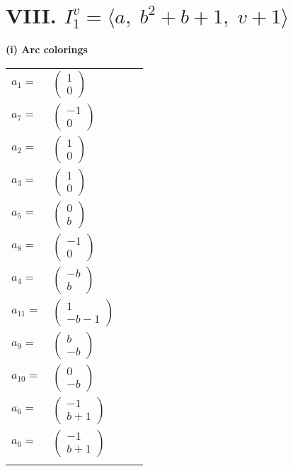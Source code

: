 \documentclass[1p]{elsarticle_modified}
\theoremstyle{definition}
\begin{document}
\centering \section*{VIII. $I^v_{1}= \langle a,\;b^2+b+1,\;v+1 \rangle$}
\flushleft \textbf{(i) Arc colorings}\\
\begin{tabular}{m{7pt} m{180pt} m{7pt} m{180pt} }
\flushright $a_{1}=$&$\begin{pmatrix}1\\0\end{pmatrix}$ \\
\flushright $a_{7}=$&$\begin{pmatrix}-1\\0\end{pmatrix}$ \\
\flushright $a_{2}=$&$\begin{pmatrix}1\\0\end{pmatrix}$ \\
\flushright $a_{3}=$&$\begin{pmatrix}1\\0\end{pmatrix}$ \\
\flushright $a_{5}=$&$\begin{pmatrix}0\\b\end{pmatrix}$ \\
\flushright $a_{8}=$&$\begin{pmatrix}-1\\0\end{pmatrix}$ \\
\flushright $a_{4}=$&$\begin{pmatrix}- b\\b\end{pmatrix}$ \\
\flushright $a_{11}=$&$\begin{pmatrix}1\\- b-1\end{pmatrix}$ \\
\flushright $a_{9}=$&$\begin{pmatrix}b\\- b\end{pmatrix}$ \\
\flushright $a_{10}=$&$\begin{pmatrix}0\\- b\end{pmatrix}$ \\
\flushright $a_{6}=$&$\begin{pmatrix}-1\\b+1\end{pmatrix}$\\ \flushright $a_{6}=$&$\begin{pmatrix}-1\\b+1\end{pmatrix}$\\&\end{tabular}
\end{document}
